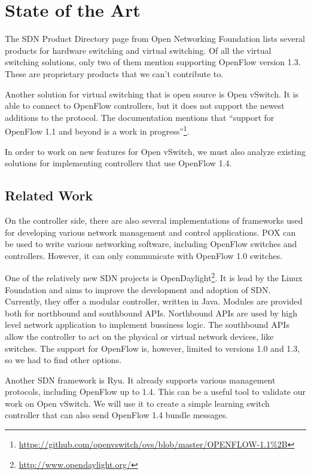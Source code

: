 \chapter{State of the Art}
\label{chapter:sota} 

The SDN Product Directory\cite{onf:products} page from Open Networking Foundation\cite{onf} lists
several products for hardware switching and virtual switching. Of all the virtual switching solutions,
only two of them mention supporting OpenFlow version 1.3. These are proprietary products that
we can't contribute to.

Another solution for virtual switching that is open source is Open vSwitch. It is able to connect to OpenFlow controllers,
but it does not support the newest additions to the protocol. The documentation mentions that 
``support for OpenFlow 1.1 and beyond is a work in progress''\footnote{\url{https://github.com/openvswitch/ovs/blob/master/OPENFLOW-1.1\%2B}}.
 
In order to work on new features for Open vSwitch, we must also analyze existing solutions for implementing controllers
that use OpenFlow 1.4.
 
\section{Related Work}


On the controller side, there are also several implementations of frameworks used for developing
various network management and control applications. POX\cite{pox} can be used to write various networking software,
including OpenFlow switches and controllers. However, it can only communicate with OpenFlow 1.0 switches.

One of the relatively new SDN projects is OpenDaylight\footnote{\url{http://www.opendaylight.org/}}. It is lead by
the Linux Foundation and aims to improve the development and adoption of SDN. Currently, they offer a modular controller,
written in Java. Modules are provided both for northbound and southbound APIs. Northbound APIs are used by high level
network application to implement bussiness logic. The southbound APIs allow the controller to act on the physical or
virtual network devices, like switches. The support for OpenFlow is, however, limited to versions 1.0 and 1.3, so
we had to find other options.

Another SDN framework is Ryu\cite{ryu}. It already supports various management protocols, including OpenFlow up to 1.4.
This can be a useful tool to validate our work on Open vSwitch. We will use it to create a simple learning switch
controller that can also send OpenFlow 1.4 bundle messages.


